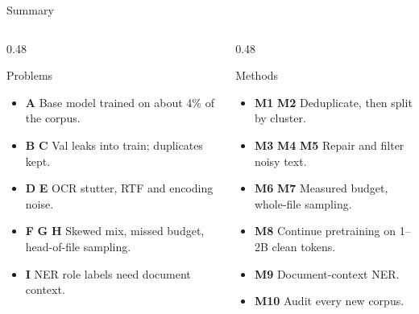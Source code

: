 \documentclass[aspectratio=169,11pt]{beamer}
\newcommand{\pb}[1]{\textbf{\textcolor{warm}{#1}}}   %
\newcommand{\mt}[1]{\textbf{\textcolor{aqua!80!black}{#1}}} %
\begin{document}
\begin{frame}{Summary}
  \begin{columns}[T]
    \begin{column}{0.48\textwidth}
      \footnotesize
      \begin{alertblock}{Problems}
        \begin{itemize}
          \item \pb{A} Base model trained on about 4\% of the corpus.
          \item \pb{B} \pb{C} Val leaks into train; duplicates kept.
          \item \pb{D} \pb{E} OCR stutter, RTF and encoding noise.
          \item \pb{F} \pb{G} \pb{H} Skewed mix, missed budget, head-of-file sampling.
          \item \pb{I} NER role labels need document context.
        \end{itemize}
      \end{alertblock}
    \end{column}
    \begin{column}{0.48\textwidth}
      \footnotesize
      \begin{exampleblock}{Methods}
        \begin{itemize}
          \item \mt{M1} \mt{M2} Deduplicate, then split by cluster.
          \item \mt{M3} \mt{M4} \mt{M5} Repair and filter noisy text.
          \item \mt{M6} \mt{M7} Measured budget, whole-file sampling.
          \item \mt{M8} Continue pretraining on 1--2B clean tokens.
          \item \mt{M9} Document-context NER.
          \item \mt{M10} Audit every new corpus.
        \end{itemize}
      \end{exampleblock}
    \end{column}
  \end{columns}
\end{frame}
\end{document}
